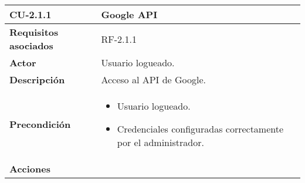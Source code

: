 \begin{longtable}[H]{@{}l|l@{}}
	\toprule
	\begin{minipage}[b]{0.23\columnwidth}\raggedright\strut
		\textbf{CU-2.1.1}\strut
	\end{minipage} & \begin{minipage}[b]{0.71\columnwidth}\raggedright\strut
		\textbf{Google API}\strut
	\end{minipage}\tabularnewline
	\toprule
	\endhead
	\begin{minipage}[t]{0.23\columnwidth}\raggedright\strut
		\textbf{Requisitos asociados}\strut
	\end{minipage} & \begin{minipage}[t]{0.71\columnwidth}\raggedright\strut
		RF-2.1.1\strut
	\end{minipage}\tabularnewline
	\midrule
	\begin{minipage}[t]{0.23\columnwidth}\raggedright\strut
		\textbf{Actor}\strut
	\end{minipage} & \begin{minipage}[t]{0.71\columnwidth}\raggedright\strut
		Usuario logueado.\strut
	\end{minipage}\tabularnewline
	\midrule
	\begin{minipage}[t]{0.23\columnwidth}\raggedright\strut
		\textbf{Descripción}\strut
	\end{minipage} & \begin{minipage}[t]{0.71\columnwidth}\raggedright\strut
		Acceso al API de Google.\strut
	\end{minipage}\tabularnewline
	\midrule
	\begin{minipage}[t]{0.23\columnwidth}\raggedright\strut
		\textbf{Precondición}\strut
	\end{minipage} & \begin{minipage}[t]{0.71\columnwidth}\raggedright\strut
		\begin{itemize}
			\item Usuario logueado.
			\item Credenciales configuradas correctamente por el administrador.
		\end{itemize}
	\end{minipage}\tabularnewline
	\midrule
	\begin{minipage}[t]{0.23\columnwidth}\raggedright\strut
		\textbf{Acciones}\strut
	\end{minipage} & \begin{minipage}[t]{0.71\columnwidth}\raggedright
		

\end{minipage}
\end{longtable}
